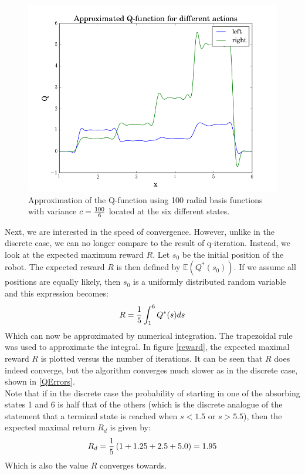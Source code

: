 \documentclass [a4paper] {report}
\begin{document}
	\begin{figure}[H]
		\begin{center}
			\includegraphics[scale=0.4]{Images/q_approx100.png}
			\caption{Approximation of the Q-function using 100 radial basis functions with variance $c={100 \over 6}$ located at the six different states.}
			\label{Qfunc2}
		\end{center}
	\end{figure}
	
	\noindent
	Next, we are interested in the speed of convergence. However, unlike in the discrete case, we can no longer compare to the result of q-iteration. Instead, we look at the expected maximum reward $R$. Let $s_{0}$ be the initial position of the robot. The expected reward  $R$ is then defined by $\mathbb{E}(Q^{*}(s_{0}))$. If we assume all positions are equally likely, then $s_{0}$ is a uniformly distributed random variable and this expression becomes:
	$$ R = {1\over 5} \int_{1}^{6} Q^{*}(s) ds$$
	Which can now be approximated by numerical integration. The trapezoidal rule was used to approximate the integral. In figure \ref{reward}, the expected maximal reward $R$ is plotted versus the number of iterations. It can be seen that $R$ does indeed converge, but the algorithm converges much slower as in the discrete case, shown in \ref{QErrors}. \\
	Note that if in the discrete case the probability of starting in one of the absorbing states 1 and 6 is half that of the others (which is the discrete analogue of the statement that a terminal state is reached when $s<1.5$ or $s>5.5$), then the expected maximal return $R_{d}$ is given by:
	$$ R_{d} = {1\over 5}\left( 1+1.25+2.5+5.0 \right)=1.95 $$
	Which is also the value $R$ converges towards.
	
\end{document}
